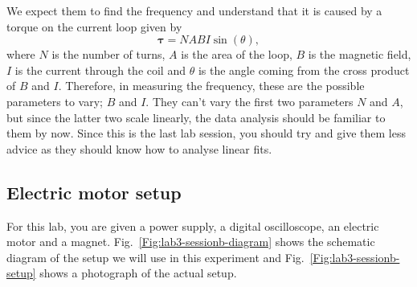 \documentclass[12pt]{report}
\begin{document}
\begin{tcolorbox}
We expect them to find the frequency and understand that it is caused by a torque on the current loop given by 
\begin{equation}
\bm{\tau} = N A B I \sin(\theta),
\end{equation}
where $N$ is the number of turns, $A$ is the area of the loop, $B$ is the magnetic field, $I$ is the current through the coil and $\theta$ is the angle coming from the cross product of $B$ and $I$. 
Therefore, in measuring the frequency, these are the possible parameters to vary; $B$ and $I$.
They can't vary the first two parameters $N$ and $A$, but since the latter two scale linearly, the data analysis should be familiar to them by now.
Since this is the last lab session, you should try and give them less advice as they should know how to analyse linear fits.
\end{tcolorbox}

\subsection{Electric motor setup}
For this lab, you are given a power supply, a digital oscilloscope, an electric motor and a magnet. 
Fig.~\ref{Fig:lab3-sessionb-diagram} shows the schematic diagram of the setup we will use in this experiment and Fig.~\ref{Fig:lab3-sessionb-setup} shows a photograph of the actual setup. 
\end{document}
